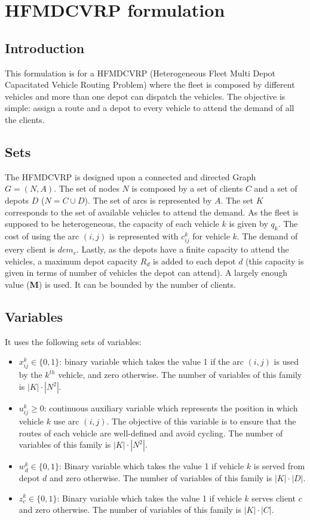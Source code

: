 \documentclass[preprint,review,12pt]{elsarticle}
\begin{document}
\section{HFMDCVRP formulation}
\subsection{Introduction}
This formulation is for a HFMDCVRP (Heterogeneous Fleet Multi Depot Capacitated Vehicle Routing Problem) where the fleet is composed by different vehicles and more than one depot can dispatch the vehicles. The objective is simple: assign a route and a depot to every vehicle  to attend the demand of all the clients.

\subsection{Sets}
The HFMDCVRP is designed upon a connected and directed Graph $G = (N,A)$. The set of nodes $N$ is composed by a set of clients $C$ and a set of depots $D$ ($N = C \cup D$). The set of arcs is represented by $A$. The set $K$ corresponds to the set of available vehicles to attend the demand. As the fleet is supposed to be heterogeneous, the capacity of each vehicle $k$ is given by $q_k$. The cost of using the arc $(i,j)$ is represented with $c_{ij}^k$ for vehicle $k$. The demand of every client is $dem_c$. Lastly, as the depots have a finite capacity to attend the vehicles, a maximum depot capacity $R_d$ is added to each depot $d$ (this capacity is given in terms of number of vehicles the depot can attend). A largely enough value (\textbf{M}) is used. It can be bounded by the number of clients.

\subsection{Variables}
It uses the following sets of variables:

\begin{itemize}
	\item $x_{ij}^k \in \{0,1\}$: binary variable which takes the value 1 if the arc $(i,j)$ is used by the $k^{th}$ vehicle, and zero otherwise. The number of variables of this family is $|K| \cdot |N^2|$.
	\item $u_{ij}^k \geq 0$: continuous auxiliary variable which represents the position in which vehicle $k$ use arc $(i,j)$. The objective of this variable is to ensure that the routes of each vehicle are well-defined and avoid cycling. The number of variables of this family is $|K| \cdot |N^2|$.
	\item  $w_d^k \in  \{0,1\}$: Binary variable which takes the value 1 if vehicle $k$ is served from depot $d$ and zero otherwise. The number of variables of this family is $|K| \cdot |D|$.
	\item $z_{c}^k \in  \{0,1\}$: Binary variable which takes the value 1 if vehicle $k$ serves client $c$ and zero otherwise. The number of variables of this family is $|K| \cdot |C|$.
\end{itemize}
\end{document}
